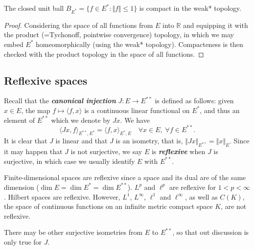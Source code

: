 \documentclass{article}
\theoremstyle{definition}
\numberwithin{equation}{section}
\newcommand{\R}{\mathbb{R}}
\begin{document}
	\begin{thm}\label{BAB}
		The closed unit ball $B_{E^*}=\{f\in E^*:\Vert f\Vert\leq1\}$ is compact in the weak* topology.
	\end{thm}
	\begin{proof}
		Considering the space of all functions from $E$ into $\R$ and equipping it with the product (=Tychonoff, pointwise convergence) topology, in which we may embed $E^*$ homeomorphically (using the weak* topology). Compacteness is then checked with the product topology in the space of all functions.
	\end{proof}
	
	\subsection{Reflexive spaces}
	Recall that the \textbf{\textit{canonical injection}} $J:E\to E^{**}$ is defined as follows: given $x\in E$, the map $f\mapsto\langle f,x\rangle$ is a continuous linear functional on $E^*$, and thus an element of $E^{**}$ which we denote by $Jx$. We have
	\[\langle Jx,f\rangle_{E^{**},E^*}=\langle f,x\rangle_{E^*,E}\quad\forall x\in E,\;\forall f\in E^{**}.\]
	It is clear that $J$ is linear and that $J$ is an isometry, that is, $\Vert Jx\Vert_{E^{**}}=\Vert x\Vert_E$. Since it may happen that $J$ is not surjective, we say $E$ is \textbf{\textit{reflexive}} when $J$ is surjective, in which case we usually identify $E$ with $E^{**}$.
	
	\begin{remark}
		Finite-dimensional spaces are reflexive since a space and its dual are of the same dimension ($\dim E=\dim E^*=\dim E^{**}$). $L^p$ and $\ell^p$ are reflexive for $1<p<\infty$. Hilbert spaces are reflexive. However, $L^1$, $L^\infty$, $\ell^1$ and $\ell^\infty$, as well as $C(K)$, the space of continuous functions on an infinite metric compact space $K$, are not reflexive.
	\end{remark}
	\begin{remark}
		There may be other surjective isometries from $E$ to $E^{**}$, so that out discussion is only true for $J$.
	\end{remark}
	
\end{document}
